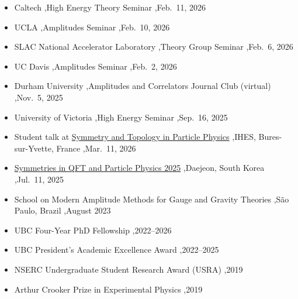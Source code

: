 \documentclass[letterpaper,10pt]{article}
\begin{document}

\begin{itemize}
\item Caltech \sep High Energy Theory Seminar \sep Feb.\ 11, 2026
\item UCLA \sep Amplitudes Seminar \sep Feb.\ 10, 2026
\item SLAC National Accelerator Laboratory \sep Theory Group Seminar \sep Feb.\ 6, 2026
\item UC Davis \sep Amplitudes Seminar \sep Feb.\ 2, 2026
\item Durham University \sep Amplitudes and Correlators Journal Club (virtual) \sep Nov.\ 5, 2025
\item University of Victoria \sep High Energy Seminar \sep Sep.\ 16, 2025
\end{itemize}


\begin{itemize}
\item Student talk at \href{https://www.ihes.fr/en/workshop-symmetry-and-topology-in-particle-physics-2/}{Symmetry and Topology in Particle Physics} \sep IHES, Bures-sur-Yvette, France \sep Mar.\ 11, 2026
\item \href{https://sites.google.com/view/symmetry2025/home?authuser=0}{Symmetries in QFT and Particle Physics 2025} \sep Daejeon, South Korea \sep Jul.\ 11, 2025
\end{itemize}


\begin{itemize}
\item School on Modern Amplitude Methods for Gauge and Gravity Theories \sep S\~ao Paulo, Brazil \sep August 2023
\end{itemize}


\begin{itemize}
\item UBC Four-Year PhD Fellowship \sep 2022--2026
\item UBC President's Academic Excellence Award \sep 2022--2025
\item NSERC Undergraduate Student Research Award (USRA) \sep 2019
\item Arthur Crooker Prize in Experimental Physics \sep 2019
\end{itemize}

\end{document}
